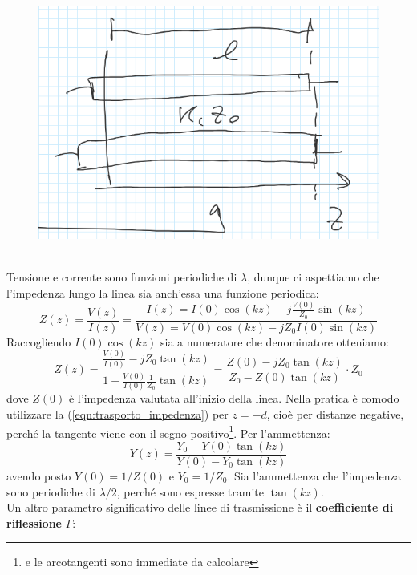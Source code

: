 \documentclass{book}
\begin{document}
        \begin{figure}[h!]
            \center  
            \includegraphics[width=0.75\linewidth]{Chapter_two/Chapt2img4.png}
        \end{figure}
        \\
        Tensione e corrente sono funzioni periodiche di $\lambda$, dunque ci aspettiamo che l'impedenza lungo la linea sia anch'essa 
        una funzione periodica:
        \begin{equation}
            Z(z) = \frac{V(z)}{I(z)} = \frac{\displaystyle I(z) = I(0)\cos(kz)-j\frac{V(0)}{Z_{0}}\sin(kz)}{V(z) = V(0)\cos(kz)-jZ_{0}I(0)\sin(kz)}
        \end{equation}
        Raccogliendo $I(0)\cos(kz)$ sia a numeratore che denominatore otteniamo:
        \begin{equation}
            \label{eqn:trasporto_impedenza}
            Z(z)=\displaystyle \frac{\displaystyle \frac{V(0)}{I(0)}-jZ_{0}\tan(kz)}{1-\displaystyle \frac{V(0)}{I(0)}\frac{1}{Z_{0}}\tan(kz)} = 
            \frac{Z(0)-jZ_{0}\tan(kz)}{\displaystyle Z_{0}-Z(0)\tan(kz)}\cdot Z_{0}
        \end{equation}
        dove $Z(0)$ è l'impedenza valutata all'inizio della linea. Nella pratica è comodo utilizzare la
        (\ref{eqn:trasporto_impedenza}) per $z=-d$, cioè per distanze negative, perché la tangente viene con il segno positivo\footnote{e le arcotangenti sono immediate da calcolare}.
        Per l'ammettenza:
        \begin{equation}
            Y(z)=\frac{Y_{0}-Y(0)\tan(kz)}{Y(0)-Y_{0}\tan(kz)}
        \end{equation}
        avendo posto $Y(0)=1/Z(0)$ e $Y_{0}=1/Z_{0}$. Sia l'ammettenza che l'impedenza sono periodiche di $\lambda/2$, perché
        sono espresse tramite $\tan(kz)$. \\
        Un altro parametro significativo delle linee di trasmissione è il \textbf{coefficiente di riflessione} $\Gamma$:
\end{document}
